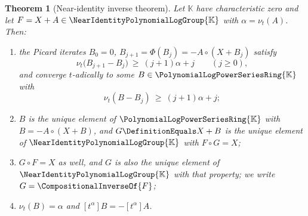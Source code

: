 \documentclass[11pt,oneside]{article}
\theoremstyle{plain}
\newtheorem{theorem}{Theorem}[section]
\theoremstyle{definition}
\theoremstyle{remark}
\newcommand{\K}{\mathbb{K}}
\newcommand{\PLpow}{\PolynomialLogPowerSeriesRing{\K}}   %
\newcommand{\Gnear}{\NearIdentityPolynomialLogGroup{\K}} %
\newcommand{\ordt}{\nu_{t}}                              %
\newcommand{\compose}{\mathbin{\circ}}
\newcommand{\rev}[1]{\CompositionalInverseOf{#1}}
\begin{document}
\begin{theorem}[Near-identity inverse theorem]
\label{plt:thm:rev-existence}
Let \(\K\) have characteristic zero and let \(F=X+A\in\Gnear\) with
\(\alpha=\ordt(A)\).  Then:
\begin{enumerate}
\item the Picard iterates \(B_0=0\), \(B_{j+1}=\Phi(B_j)=-A\compose(X+B_j)\)
satisfy
\begin{equation}\label{plt:eq:rev-picard-rate}
 \ordt\bigl(B_{j+1}-B_j\bigr)\ \ge\ (j+1)\alpha+j
 \qquad(j\ge0),
\end{equation}
and converge \(t\)-adically to some \(B\in\PLpow\) with
\begin{equation}\label{plt:eq:rev-picard-accuracy}
 \ordt(B-B_j)\ \ge\ (j+1)\alpha+j ;
\end{equation}
\item \(B\) is the unique element of \(\PLpow\) with \(B=-A\compose(X+B)\), and
\(G\DefinitionEquals X+B\) is the unique element of \(\Gnear\) with
\(F\compose G=X\);
\item \(G\compose F=X\) as well, and \(G\) is also the unique element of
\(\Gnear\) with that property; we write \(G=\rev{F}\);
\item \(\ordt(B)=\alpha\) and \([t^{\alpha}]B=-[t^{\alpha}]A\).
\end{enumerate}
\end{theorem}
\end{document}
